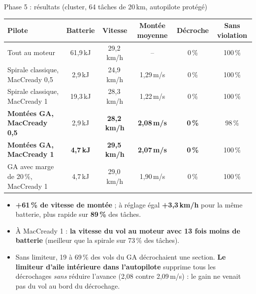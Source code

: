 \documentclass[aspectratio=169,10pt]{beamer}
\newcommand{\good}[1]{\textcolor{climb}{\textbf{#1}}}
\begin{document}
\begin{frame}{Phase 5 : résultats (cluster, 64 tâches de 20\,km, autopilote protégé)}
  \scriptsize
  \centering
  \begin{tabular}{@{}lccccc@{}}
    \toprule
    Pilote & Batterie & Vitesse & Montée moyenne & Décroche & Sans violation \\ \midrule
    Tout au moteur & 61{,}9\,kJ & 29{,}2\,km/h & -- & 0\,\% & 100\,\% \\
    Spirale classique, MacCready 0{,}5 & 2{,}9\,kJ & 24{,}9\,km/h & 1{,}29\,m/s & 0\,\% & 100\,\% \\
    Spirale classique, MacCready 1 & 19{,}3\,kJ & 28{,}3\,km/h & 1{,}22\,m/s & 0\,\% & 100\,\% \\
    \textbf{Montées GA, MacCready 0{,}5} & 2{,}9\,kJ & \good{28{,}2\,km/h} & \good{2{,}08\,m/s} & \good{0\,\%} & 98\,\% \\
    \textbf{Montées GA, MacCready 1} & \good{4{,}7\,kJ} & \good{29{,}5\,km/h} & \good{2{,}07\,m/s} & \good{0\,\%} & 100\,\% \\
    GA avec marge de 20\,\%, MacCready 1 & 4{,}7\,kJ & 29{,}0\,km/h & 1{,}90\,m/s & 0\,\% & 100\,\% \\
    \bottomrule
  \end{tabular}\par\medskip
  \small
  \begin{itemize}
    \item \good{+61\,\% de vitesse de montée} ; à réglage égal \good{+3{,}3\,km/h} pour la même batterie, plus rapide sur \textbf{89\,\%} des tâches.
    \item À MacCready 1 : \good{la vitesse du vol au moteur avec 13 fois moins de batterie} (meilleur que la spirale sur 73\,\% des tâches).
    \item Sans limiteur, 19 à 69\,\% des vols du GA décrochaient une section. \textbf{Le limiteur d'aile intérieure dans l'autopilote} supprime tous les décrochages \emph{sans} réduire l'avance (2{,}08 contre 2{,}09\,m/s) : le gain ne venait pas du vol au bord du décrochage.
  \end{itemize}
\end{frame}
\end{document}
